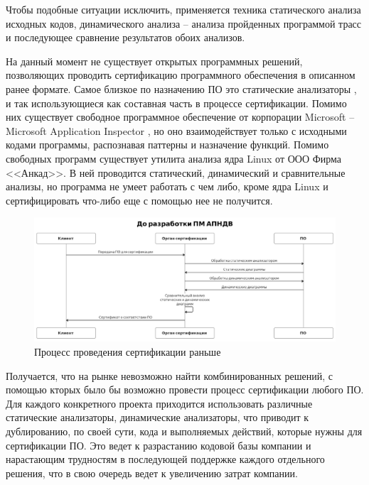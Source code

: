 Чтобы подобные ситуации исключить, применяется техника статического 
анализа исходных кодов, динамического анализа -- анализа пройденных 
программой трасс и последующее сравнение результатов обоих анализов.

На данный момент не существует открытых программных решений,
позволяющих проводить сертификацию программного обеспечения в описанном ранее формате.
Самое близкое по назначению ПО это статические анализаторы \autocite{c-static-analysis},
и так использующиеся как составная часть в процессе сертификации.
Помимо них существует свободное программное обеспечение от корпорации Microsoft --
Microsoft Application Inspector \autocite{microsoft-application-inspector}, но оно
взаимодействует только с исходными кодами программы, распознавая паттерны и назначение
функций.
Помимо свободных программ существует утилита анализа ядра Linux от ООО Фирма <<Анкад>>. 
В ней проводится статический, динамический и сравнительные анализы, но программа не умеет
работать с чем либо, кроме ядра Linux и сертифицировать что-либо еще с помощью нее не получится.

\begin{figure}[!htbp]
    \includegraphics[width=\textwidth,height=\textheight,keepaspectratio]{images/uml_before_cropped.png}
    \caption{Процесс проведения сертификации раньше\label{fig:how-cert-was-before}}
\end{figure}

Получается, что на рынке невозможно найти комбинированных решений, 
с помощью кторых было бы возможно провести процесс сертификации любого ПО. 
Для каждого конкретного проекта приходится использовать различные статические анализаторы, 
динамические анализаторы, что приводит к дублированию, по своей сути, кода и выполняемых действий, которые нужны для сертификации ПО.
Это ведет к разрастанию кодовой базы компании и нарастающим трудностям в последующей поддержке
каждого отдельного решения, что в свою очередь ведет к увеличению затрат компании.

